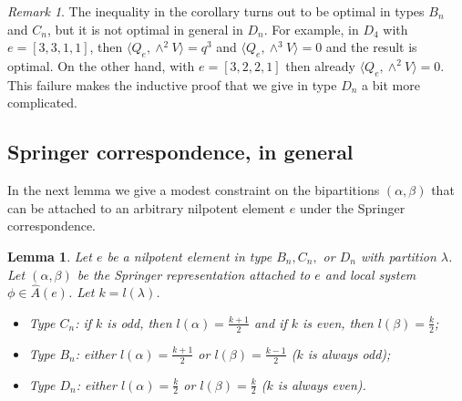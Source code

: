 \documentclass[10pt]{amsart}
\newcommand{\ar}{{\hat{A}}(e)}
\theoremstyle{plain}
\newtheorem{lemma}[theorem]{Lemma}
\theoremstyle{definition}
\theoremstyle{remark}
\newtheorem{remark}[theorem]{Remark}
\begin{document}
\begin{remark}
The inequality in the corollary turns out to be optimal in types $B_n$ and $C_n$, but it is not optimal in general in $D_n$.  For example, in $D_4$ with $e = [3,3,1,1]$, then $\langle Q_{e}, \wedge^2 V \rangle = q^3$ and $\langle Q_{e}, \wedge^3 V \rangle = 0$ and the result is optimal.  On the other hand, with $e = [3,2,2,1]$ then already $\langle Q_{e}, \wedge^2 V \rangle = 0$.   This failure makes the inductive proof that we give in type $D_n$ a bit more complicated. 
\end{remark}

\subsection{Springer correspondence, in general}

In the next lemma we give a modest constraint on the bipartitions $(\alpha, \beta)$ that can be attached to an arbitrary nilpotent element $e$ under
the Springer correspondence.

\begin{lemma}  \label{lem:constraint}
Let $e$ be a nilpotent element in type $B_n, C_n,$ or $D_n$ with partition $\lambda$.
Let $(\alpha, \beta)$ be the Springer representation attached to  $e$ and local system $\phi \in \ar$.  Let $k = l(\lambda)$. 
\begin{itemize} 
\item Type $C_n$:  if $k$ is odd, then $l(\alpha) = \frac{k+1}{2}$ and  if $k$ is even, then $l(\beta) = \frac{k}{2}$;
\item Type $B_n$:  either $l(\alpha) = \frac{k+1}{2}$ or $l(\beta) = \frac{k-1}{2}$  ($k$ is always odd);
\item Type $D_n$:  either $l(\alpha) = \frac{k}{2}$ or $l(\beta) = \frac{k}{2}$ ($k$ is always even).
\end{itemize} 
\end{lemma}
\end{document}
